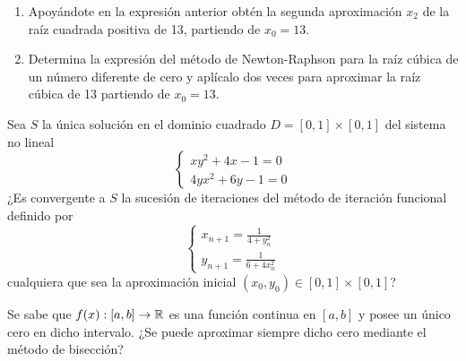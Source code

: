 \begin{ejercicio}
\begin{enumerate}
\begin{comment}
            \item $f'(x) \neq 0$ en $\left]0, a+1[$.
            \item $f''(x)=2 > 0$ no cambia de signo en $\left]0, a+1\right[$.
            \item $\max\left\{\left|\frac{f(0)}{f'(0)}\right|, \left|\frac{f(a+1)}{f'(a+1)}\right|\right\} < a+1$:
            \begin{align*}
                \dfrac{f(0)}{f'(0)} = \dfrac{-a}{0} = -\infty < a+1\\
            \end{align*}
        \end{enumerate}
        \end{comment}
        \item Apoyándote en la expresión anterior obtén la segunda aproximación $x_2$ de la raíz cuadrada positiva de 13, partiendo de $x_0 = 13$.
        \item Determina la expresión del método de Newton-Raphson para la raíz cúbica de un número diferente de cero y aplícalo dos veces para aproximar la raíz cúbica de 13 partiendo de $x_0 = 13$.
    \end{enumerate}
\end{ejercicio}

\begin{ejercicio}
    Sea $S$ la única solución en el dominio cuadrado $D = [0, 1] \times [0, 1]$ del sistema no lineal
    \[
        \begin{cases}
            xy^2 + 4x - 1 = 0\\
            4yx^2 + 6y - 1 = 0
        \end{cases}
    \]
    ¿Es convergente a $S$ la sucesión de iteraciones del método de iteración funcional definido por
    \[
        \begin{cases}
            x_{n+1} = \frac{1}{4 + y_n^2}\\
            y_{n+1} = \frac{1}{6 + 4x_n^2}
        \end{cases}
    \]
    cualquiera que sea la aproximación inicial $(x_0, y_0) \in [0, 1] \times [0, 1]$?
\end{ejercicio}

\begin{ejercicio}
    Se sabe que $f(x) : [a, b] \to \mathbb{R}$ es una función continua en $[a, b]$ y posee un único cero en dicho intervalo. ¿Se puede aproximar siempre dicho cero mediante el método de bisección?
\end{ejercicio}

